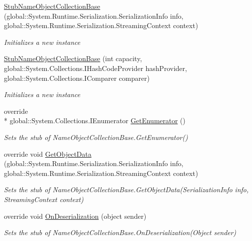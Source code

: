 \begin{DoxyCompactItemize}
\hyperlink{class_system_1_1_collections_1_1_specialized_1_1_fakes_1_1_stub_name_object_collection_base_a0f6183a2e780358e935158810d3adc3d}{Stub\-Name\-Object\-Collection\-Base} (global\-::\-System.\-Runtime.\-Serialization.\-Serialization\-Info info, global\-::\-System.\-Runtime.\-Serialization.\-Streaming\-Context context)
\begin{DoxyCompactList}\small\item\em Initializes a new instance\end{DoxyCompactList}\item 
\hyperlink{class_system_1_1_collections_1_1_specialized_1_1_fakes_1_1_stub_name_object_collection_base_a9b068d53b73ca3649aff28cded6c65b1}{Stub\-Name\-Object\-Collection\-Base} (int capacity, global\-::\-System.\-Collections.\-I\-Hash\-Code\-Provider hash\-Provider, global\-::\-System.\-Collections.\-I\-Comparer comparer)
\begin{DoxyCompactList}\small\item\em Initializes a new instance\end{DoxyCompactList}\item 
override \\*
global\-::\-System.\-Collections.\-I\-Enumerator \hyperlink{class_system_1_1_collections_1_1_specialized_1_1_fakes_1_1_stub_name_object_collection_base_a4c3cf0b04e8d5dfa74ef9b9ca6cbefd4}{Get\-Enumerator} ()
\begin{DoxyCompactList}\small\item\em Sets the stub of Name\-Object\-Collection\-Base.\-Get\-Enumerator()\end{DoxyCompactList}\item 
override void \hyperlink{class_system_1_1_collections_1_1_specialized_1_1_fakes_1_1_stub_name_object_collection_base_a42bfd4b739f1fb1896890201be506460}{Get\-Object\-Data} (global\-::\-System.\-Runtime.\-Serialization.\-Serialization\-Info info, global\-::\-System.\-Runtime.\-Serialization.\-Streaming\-Context context)
\begin{DoxyCompactList}\small\item\em Sets the stub of Name\-Object\-Collection\-Base.\-Get\-Object\-Data(\-Serialization\-Info info, Streaming\-Context context)\end{DoxyCompactList}\item 
override void \hyperlink{class_system_1_1_collections_1_1_specialized_1_1_fakes_1_1_stub_name_object_collection_base_a1fbcee2af7fc7c7a6cc79001f4022db2}{On\-Deserialization} (object sender)
\begin{DoxyCompactList}\small\item\em Sets the stub of Name\-Object\-Collection\-Base.\-On\-Deserialization(\-Object sender)\end{DoxyCompactList}\end{DoxyCompactItemize}
